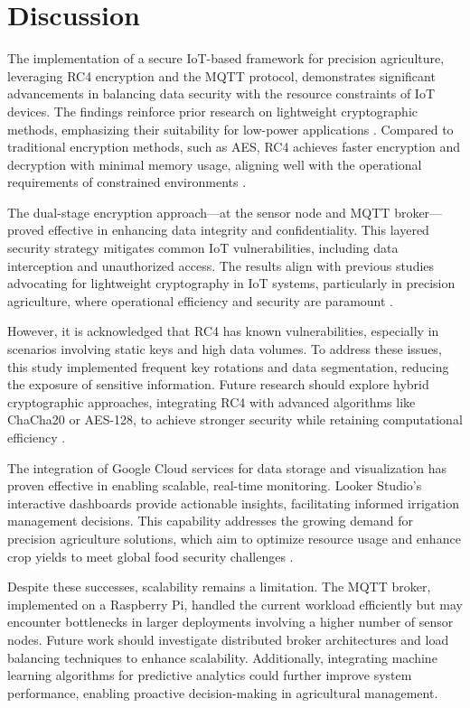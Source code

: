 \documentclass[journal]{Definitions/mdpi}
\begin{document}
\section{Discussion}

The implementation of a secure IoT-based framework for precision agriculture, leveraging RC4 encryption and the MQTT protocol, demonstrates significant advancements in balancing data security with the resource constraints of IoT devices. The findings reinforce prior research on lightweight cryptographic methods, emphasizing their suitability for low-power applications \cite{ref-journal2, ref-journal4}. Compared to traditional encryption methods, such as AES, RC4 achieves faster encryption and decryption with minimal memory usage, aligning well with the operational requirements of constrained environments \cite{ref-standards1}.

The dual-stage encryption approach—at the sensor node and MQTT broker—proved effective in enhancing data integrity and confidentiality. This layered security strategy mitigates common IoT vulnerabilities, including data interception and unauthorized access. The results align with previous studies advocating for lightweight cryptography in IoT systems, particularly in precision agriculture, where operational efficiency and security are paramount \cite{ref-journal6, ref-conference2}.

However, it is acknowledged that RC4 has known vulnerabilities, especially in scenarios involving static keys and high data volumes. To address these issues, this study implemented frequent key rotations and data segmentation, reducing the exposure of sensitive information. Future research should explore hybrid cryptographic approaches, integrating RC4 with advanced algorithms like ChaCha20 or AES-128, to achieve stronger security while retaining computational efficiency \cite{ref-journal5, ref-journal7}.

The integration of Google Cloud services for data storage and visualization has proven effective in enabling scalable, real-time monitoring. Looker Studio’s interactive dashboards provide actionable insights, facilitating informed irrigation management decisions. This capability addresses the growing demand for precision agriculture solutions, which aim to optimize resource usage and enhance crop yields to meet global food security challenges \cite{ref-report1, ref-cloud2}.

Despite these successes, scalability remains a limitation. The MQTT broker, implemented on a Raspberry Pi, handled the current workload efficiently but may encounter bottlenecks in larger deployments involving a higher number of sensor nodes. Future work should investigate distributed broker architectures and load balancing techniques to enhance scalability. Additionally, integrating machine learning algorithms for predictive analytics could further improve system performance, enabling proactive decision-making in agricultural management.
\end{document}
